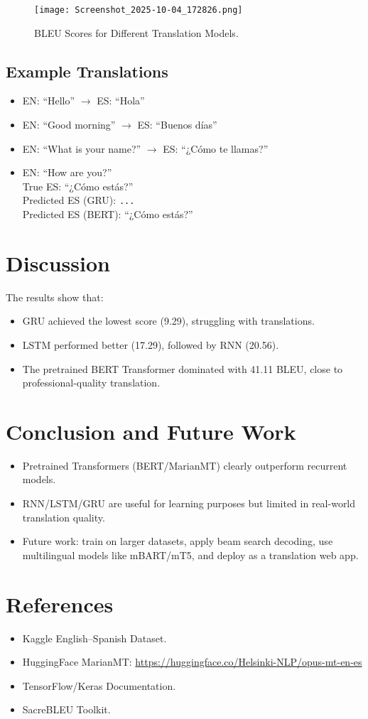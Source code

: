 \documentclass[12pt,a4paper]{article}
\begin{document}
\begin{figure}[h]
\centering
\texttt{[image: Screenshot\_2025-10-04\_172826.png]}
\caption{BLEU Scores for Different Translation Models.}
\end{figure}

\subsection{Example Translations}
\begin{itemize}
    \item EN: ``Hello'' $\rightarrow$ ES: ``Hola''
    \item EN: ``Good morning'' $\rightarrow$ ES: ``Buenos días''
    \item EN: ``What is your name?'' $\rightarrow$ ES: ``¿Cómo te llamas?''
    \item EN: ``How are you?'' \\
          True ES: ``¿Cómo estás?'' \\
          Predicted ES (GRU): \texttt{...} \\
          Predicted ES (BERT): ``¿Cómo estás?''
\end{itemize}

\section{Discussion}
The results show that:
\begin{itemize}
    \item GRU achieved the lowest score (9.29), struggling with translations.
    \item LSTM performed better (17.29), followed by RNN (20.56).
    \item The pretrained BERT Transformer dominated with 41.11 BLEU, close to professional-quality translation.
\end{itemize}

\section{Conclusion and Future Work}
\begin{itemize}
    \item Pretrained Transformers (BERT/MarianMT) clearly outperform recurrent models.
    \item RNN/LSTM/GRU are useful for learning purposes but limited in real-world translation quality.
    \item Future work: train on larger datasets, apply beam search decoding, use multilingual models like mBART/mT5, and deploy as a translation web app.
\end{itemize}

\section*{References}
\begin{itemize}
    \item Kaggle English–Spanish Dataset.
    \item HuggingFace MarianMT: \url{https://huggingface.co/Helsinki-NLP/opus-mt-en-es}
    \item TensorFlow/Keras Documentation.
    \item SacreBLEU Toolkit.
\end{itemize}
\end{document}
